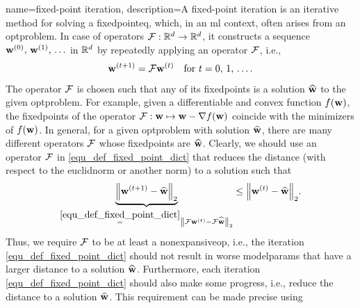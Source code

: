 {name={fixed-point iteration},
	description={A fixed-point \gls{iteration} is an iterative method 
	     	for solving a \gls{fixedpointeq}, which, in an \gls{ml} context, often arises from an \gls{optproblem}. 
		In case of \glspl{operator} $\mathcal{F}: \mathbb{R}^d \to \mathbb{R}^d$,
		it constructs a \gls{sequence} ${\bf w}^{(0)}, \,{\bf w}^{(1)}, \,\ldots$ in $\mathbb{R}^d$ by 
		repeatedly applying an \gls{operator} $\mathcal{F}$, i.e.,
		\begin{equation} 
		 	\label{equ_def_fixed_point_dict} 
		 	{\bf w}^{(t+1)} = \mathcal{F} {\bf w}^{(t)} \quad \mbox{for } t=0, \,1, \,\ldots.
		\end{equation} 
		The \gls{operator} $\mathcal{F}$ is chosen such that any of its \glspl{fixedpoint} is a solution 
		$\widehat{{\bf w}}$ to the given \gls{optproblem}. For example, given a \gls{differentiable} and 
		\gls{convex} \gls{function} $f({\bf w})$, the \glspl{fixedpoint} of the \gls{operator} $\mathcal{F}: {\bf w} \mapsto {\bf w} - \nabla f({\bf w})$ 
		coincide with the minimizers of $f({\bf w})$. In general, for a given \gls{optproblem} 
		with solution $\widehat{{\bf w}}$, there are many different \glspl{operator} 
		$\mathcal{F}$ whose \glspl{fixedpoint} are $\widehat{{\bf w}}$. Clearly, we should use an 
		\gls{operator} $\mathcal{F}$ in \eqref{equ_def_fixed_point_dict} that reduces the 
		distance (with respect to the \gls{euclidnorm} or another \gls{norm}) to a solution such that
		\begin{equation} 
			\nonumber
			\underbrace{\normgeneric{ \weights^{(\iteridx+1)} - \widehat{\weights}}{2}}_{\stackrel{\eqref{equ_def_fixed_point_dict}}{=} \normgeneric{ \fixedpointop \weights^{(\iteridx)} - \fixedpointop\widehat{\weights}}{2}}  \leq 	\normgeneric{ \weights^{(\iteridx)} - \widehat{\weights}}{2}. 
		\end{equation}
		Thus, we require $\mathcal{F}$ to be at least a \gls{nonexpansiveop}, i.e., the \gls{iteration} \eqref{equ_def_fixed_point_dict} 
		should not result in worse \glspl{modelparam} that have a larger distance to a solution $\widehat{{\bf w}}$. 
		Furthermore, each \gls{iteration} \eqref{equ_def_fixed_point_dict} should also make some progress, i.e., 
		reduce the distance to a solution $\widehat{{\bf w}}$. This requirement can be made precise using 
}}
